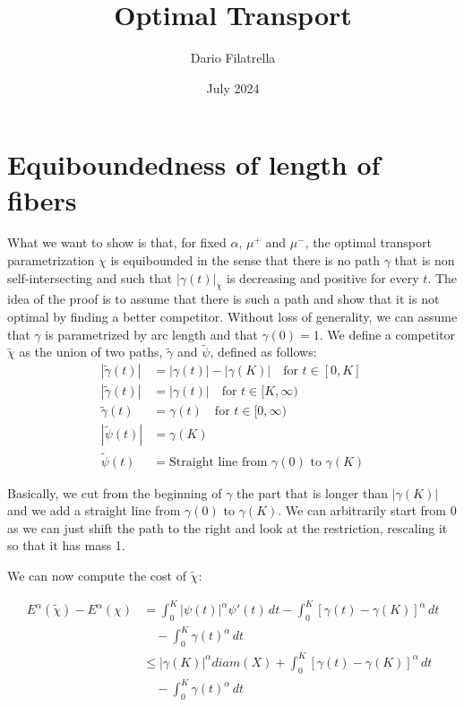 \documentclass[11pt]{article}
\title{Optimal Transport}
\author{Dario Filatrella}
\date{July 2024}
\begin{document}
    \maketitle


    \section{Equiboundedness of length of fibers}

    What we want to show is that, for fixed $\alpha$, $\mu^+$ and $\mu^-$, the optimal transport parametrization $\chi$
    is equibounded in the sense that there is no path $\gamma$ that is non self-intersecting and such that $|\gamma(t)|_\chi$ is decreasing and positive
    for every $t$.
    The idea of the proof is to assume that there is such a path and show that it is not optimal by finding a better competitor.
    Without loss of generality, we can assume that $\gamma$ is parametrized by arc length and that $\gamma(0) = 1$.
    We define a competitor $\tilde\chi$ as the union of two paths, $\tilde{\gamma}$ and $\tilde{\psi}$, defined as follows:
    \begin{align*}
        |\tilde{\gamma}(t)| &= |\gamma(t)| - |\gamma(K)| \quad \text{for } t \in [0, K] \\
        |\tilde{\gamma}(t)| &= |\gamma(t)| \quad \text{for } t \in [K, \infty) \\
        \tilde{\gamma}(t) &= \gamma(t) \quad \text{for } t \in [0, \infty) \\
        |\tilde{\psi}(t)| &= \gamma(K) \\
        \tilde{\psi}(t) &= \text{Straight line from } \gamma(0) \text{ to } \gamma(K)
    \end{align*}

    Basically, we cut from the beginning of $\gamma$ the part that is longer than $|\gamma(K)|$ and we add a straight line from
    $\gamma(0)$ to $\gamma(K)$. We can arbitrarily start from 0 as we can just shift the path to the right and look at the restriction,
    rescaling it so that it has mass 1.

    We can now compute the cost of $\tilde{\chi}$:

    \begin{align*}
        E^\alpha(\tilde{\chi}) - E^\alpha(\chi) &= \int_0^K |\psi(t)|^\alpha \psi'(t) \, dt - \int_0^K \left[\gamma(t) - \gamma(K)\right]^\alpha \, dt \\
        &\quad - \int_0^K \gamma(t)^\alpha \, dt \\
        &\le |\gamma(K)|^\alpha diam(X) +  \int_0^K \left[\gamma(t) - \gamma(K)\right]^\alpha \, dt \\
        &\quad - \int_0^K \gamma(t)^\alpha \, dt \\
    \end{align*}
\end{document}
